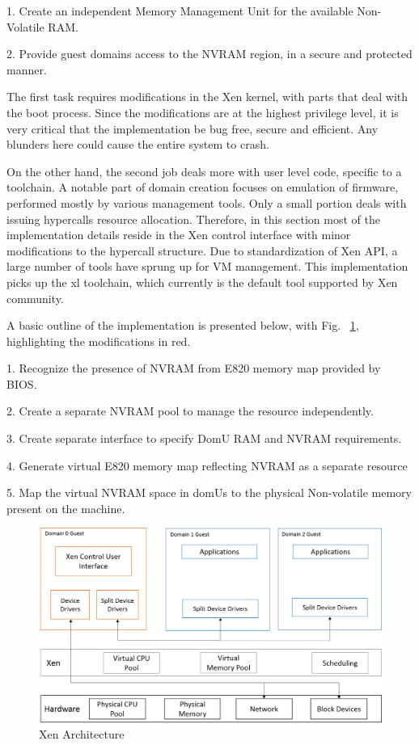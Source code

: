 1. Create an independent Memory Management Unit for the available Non-Volatile RAM. 

2. Provide guest domains access to the NVRAM region, in a secure and protected manner. 

The first task requires modifications in the Xen kernel, with parts that deal with the boot process. Since the modifications are at the highest privilege level, it is very critical that the implementation be bug free, secure and efficient. Any blunders here could cause the entire system to crash.  

On the other hand, the second job deals more with user level code, specific to a toolchain. A notable part of domain creation focuses on emulation of firmware, performed mostly by various management tools. Only a small portion deals with issuing hypercalls resource allocation. Therefore, in this section most of the implementation details reside in the Xen control interface with minor modifications to the hypercall structure. Due to standardization of Xen API, a large number of tools have sprung up for VM management. This implementation picks up the xl toolchain, which currently is the default tool supported by Xen community. 

A basic outline of the implementation is presented below, with Fig. ~\ref{fig:xen_mod}, highlighting the modifications in red. 

1. Recognize the presence of NVRAM from E820 memory map provided by BIOS. 

2. Create a separate NVRAM pool to manage the resource independently. 

3. Create separate interface to specify DomU RAM and NVRAM requirements. 

4. Generate virtual E820 memory map reflecting NVRAM as a separate resource 

5. Map the virtual NVRAM space in domUs to the physical Non-volatile memory present on the machine. 

\begin{figure}
\centering
\includegraphics[scale=0.6]{figures/Xen_model.png}
\caption{Xen Architecture}
\label{fig:xen_mod}
\end{figure}

